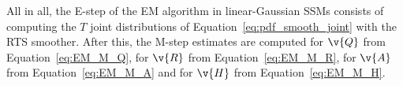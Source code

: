 All in all, the E-step of the EM algorithm in linear-Gaussian SSMs consists of
computing the $T$ joint distributions of Equation~\eqref{eq:pdf_smooth_joint} with the RTS smoother.
After this, the M-step estimates are computed for $\v{Q}$
from Equation~\eqref{eq:EM_M_Q}, for $\v{R}$ from Equation~\eqref{eq:EM_M_R}, for $\v{A}$ from
Equation~\eqref{eq:EM_M_A} and for $\v{H}$ from Equation~\eqref{eq:EM_M_H}. 


% 

